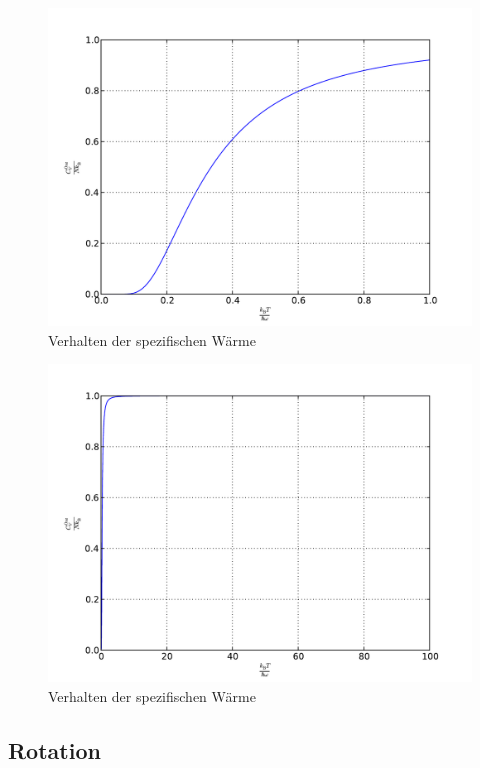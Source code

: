 \begin{figure}
    \centering
    \includegraphics[width=\textwidth]{C_V_Osz_ll.pdf}
    \caption{Verhalten der spezifischen Wärme}
    \label{fig:C_V_Osz_ll}
\end{figure}

\begin{figure}
    \centering
    \includegraphics[width=\textwidth]{C_V_Osz_gg.pdf}
    \caption{Verhalten der spezifischen Wärme}
    \label{fig:C_V_Osz_gg}
\end{figure}

\subsection{Rotation}

